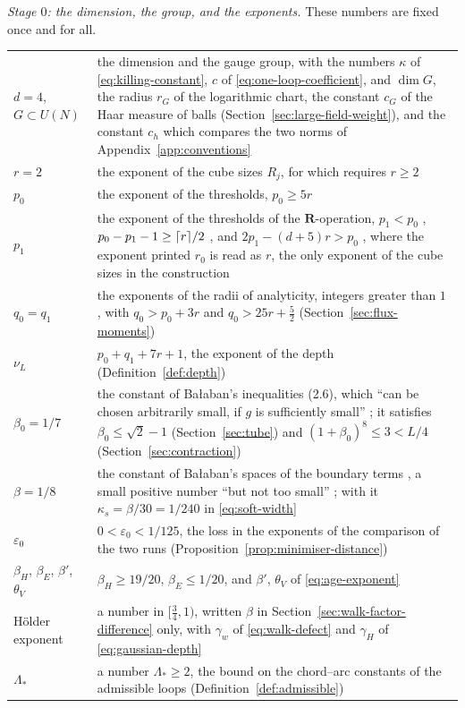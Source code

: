 \documentclass[11pt]{preprint}
\DeclarePairedDelimiter{\ceil}{\lceil}{\rceil}
\numberwithin{equation}{section}
\theoremstyle{definition}
\theoremstyle{remark}
\theoremstyle{plain}
\begin{document}
\emph{Stage $0$: the dimension, the group, and the exponents.} These numbers are fixed once and for all.
\begin{center}
\begin{tabular}{p{}p{}}
\hline
$d = 4$, $G \subset U(N)$ & the dimension and the gauge group, with the numbers $\kappa$ of \eqref{eq:killing-constant}, $c$ of \eqref{eq:one-loop-coefficient}, and $\dim G$, the radius $r_G$ of the logarithmic chart, the constant $c_G$ of the Haar measure of balls (Section~\ref{sec:large-field-weight}), and the constant $c_h$ which compares the two norms of Appendix~\ref{app:conventions} \\
$r = 2$ & the exponent of the cube sizes $R_j$, for which \cite[p.~245]{BalabanCRE} requires $r \geq 2$ \\
$p_0$ & the exponent of the thresholds, $p_0 \geq 5r$ \cite[p.~246]{BalabanCRE} \\
$p_1$ & the exponent of the thresholds of the $\mathbf R$-operation, $p_1 < p_0$ \cite[p.~183]{BalabanLFR1}, $p_0 - p_1 - 1 \geq \ceil{r}/2$ \cite[(1.94), p.~198]{BalabanLFR1}, and $2p_1 - (d + 5)r > p_0$ \cite[p.~383]{BalabanLFR2}, where the exponent printed $r_0$ is read as $r$, the only exponent of the cube sizes in the construction \\
$q_0 = q_1$ & the exponents of the radii of analyticity, integers greater than $1$ \cite[(2.28), p.~259]{BalabanCRE}, with $q_0 > p_0 + 3r$ and $q_0 > 25r + \frac52$ (Section~\ref{sec:flux-moments}) \\
$\nu_L$ & $p_0 + q_1 + 7r + 1$, the exponent of the depth (Definition~\ref{def:depth}) \\
$\beta_0 = 1/7$ & the constant of Ba{\l}aban's inequalities (2.6), which ``can be chosen arbitrarily small, if $g$ is sufficiently small'' \cite[p.~255]{BalabanCRE}; it satisfies $\beta_0 \leq \sqrt2 - 1$ (Section~\ref{sec:tube}) and $(1 + \beta_0)^8 \leq 3 < L/4$ (Section~\ref{sec:contraction}) \\
$\beta = 1/8$ & the constant of Ba{\l}aban's spaces of the boundary terms \cite[(2.34)--(2.39), p.~261]{BalabanCRE}, a small positive number ``but not too small'' \cite[p.~261]{BalabanCRE}; with it $\kappa_s = \beta/30 = 1/240$ in \eqref{eq:soft-width} \\
$\varepsilon_0$ & $0 < \varepsilon_0 < 1/125$, the loss in the exponents of the comparison of the two runs (Proposition~\ref{prop:minimiser-distance}) \\
$\beta_H$, $\beta_E$, $\beta'$, $\theta_V$ & $\beta_H \geq 19/20$, $\beta_E \leq 1/20$, and $\beta'$, $\theta_V$ of \eqref{eq:age-exponent} \\
H\"older exponent & a number in $[\frac34, 1)$, written $\beta$ in Section~\ref{sec:walk-factor-difference} only, with $\gamma_w$ of \eqref{eq:walk-defect} and $\gamma_H$ of \eqref{eq:gaussian-depth} \\
$\Lambda_*$ & a number $\Lambda_* \geq 2$, the bound on the chord--arc constants of the admissible loops (Definition~\ref{def:admissible}) \\
\hline
\end{tabular}
\end{center}
\end{document}
